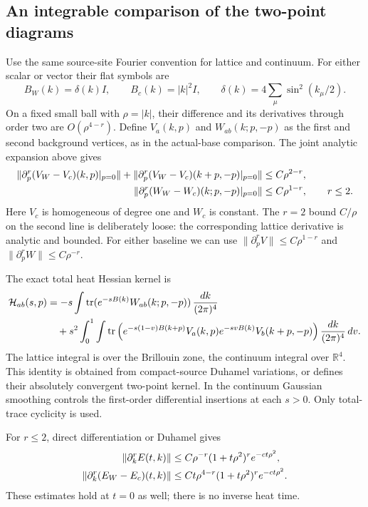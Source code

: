 \documentclass[11pt]{article}
\theoremstyle{remark}
\begin{document}
\subsection{An integrable comparison of the two-point diagrams}
\label{wcr-comparison-section}

Use the same source-site Fourier convention for lattice and continuum.
For either scalar or vector their flat symbols are
\[
 B_W(k)=\delta(k)I,\qquad B_c(k)=|k|^2I,\qquad
 \delta(k)=4\sum_\mu\sin^2(k_\mu/2).
\]
On a fixed small ball with \(\rho=|k|\), their difference and its
derivatives through order two are \(O(\rho^{4-r})\).
Define \(V_a(k,p)\) and \(W_{ab}(k;p,-p)\) as the first and second
background vertices, as in the actual-base comparison.
The joint analytic expansion above gives
\begin{align}
 \|\partial_p^r(V_W-V_c)(k,p)|_{p=0}\|
 +\|\partial_p^r(V_W-V_c)(k+p,-p)|_{p=0}\|
     &\le C\rho^{2-r},\notag\\
 \|\partial_p^r(W_W-W_c)(k;p,-p)|_{p=0}\|
     &\le C\rho^{1-r},\qquad r\le2.
 \label{wcr-vertex-errors}
\end{align}
Here \(V_c\) is homogeneous of degree one and \(W_c\) is constant.
The \(r=2\) bound \(C/\rho\) on the second line is deliberately loose:
the corresponding lattice derivative is analytic and bounded.
For either baseline we can use
\(\|\partial_p^rV\|\le C\rho^{1-r}\) and
\(\|\partial_p^rW\|\le C\rho^{-r}\).

The exact total heat Hessian kernel is
\begin{align}
 {\cal H}_{ab}(s,p)
 &=-s\int\operatorname{tr}
       (e^{-sB(k)}W_{ab}(k;p,-p))\,\frac{dk}{(2\pi)^4}
       \notag\\
 &\quad+s^2\int_0^1\int\operatorname{tr}
 \left(e^{-s(1-v)B(k+p)}V_a(k,p)
       e^{-svB(k)}V_b(k+p,-p)\right)
                         \frac{dk}{(2\pi)^4}\,dv.
 \label{wcr-diagram}
\end{align}
The lattice integral is over the Brillouin zone, the continuum integral
over \(\mathbb R^4\). This identity is obtained from compact-source
Duhamel variations, or defines their absolutely convergent two-point
kernel. In the continuum Gaussian smoothing controls the first-order
differential insertions at each \(s>0\). Only total-trace cyclicity is
used.

For \(r\le2\), direct differentiation or Duhamel gives
\begin{align}
 \|\partial_k^rE(t,k)\|
   &\le C\rho^{-r}(1+t\rho^2)^r e^{-ct\rho^2},\notag\\
 \|\partial_k^r(E_W-E_c)(t,k)\|
   &\le Ct\rho^{4-r}(1+t\rho^2)^r e^{-ct\rho^2}.
 \label{wcr-heat-errors}
\end{align}
These estimates hold at \(t=0\) as well; there is no inverse heat time.
\end{document}

